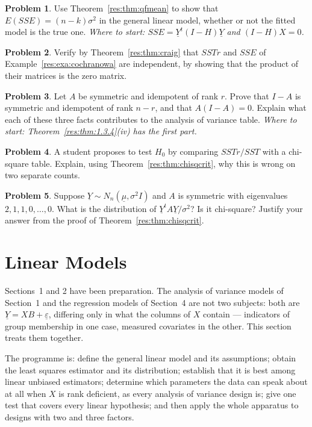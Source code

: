 \documentclass[11pt,a4paper]{article}
\theoremstyle{definition}
\newtheorem{problemx}{Problem}[section]
\newenvironment{problem}{\begin{problemx}}{\end{problemx}}
\begin{document}
\begin{problem}
Use Theorem~\ref{res:thm:qfmean} to show that
$E\left(SSE\right)=\left(n-k\right)\sigma^2$ in the general linear model,
whether or not the fitted model is the true one.
\emph{Where to start: $SSE=\underline{Y}^t(I-H)\underline{Y}$ and
$(I-H)X=0$.}
\end{problem}

\begin{problem}
Verify by Theorem~\ref{res:thm:craig} that $SSTr$ and $SSE$ of
Example~\ref{res:exa:cochranowa} are independent, by showing that the product
of their matrices is the zero matrix.
\end{problem}

\begin{problem}
Let $A$ be symmetric and idempotent of rank $r$. Prove that $I-A$ is symmetric
and idempotent of rank $n-r$, and that $A(I-A)=0$. Explain what each of these
three facts contributes to the analysis of variance table.
\emph{Where to start: Theorem~\ref{res:thm:1.3.4}(iv) has the first part.}
\end{problem}

\begin{problem}
A student proposes to test $H_0$ by comparing $SSTr/SST$ with a chi-square
table. Explain, using Theorem~\ref{res:thm:chisqcrit}, why this is wrong on
two separate counts.
\end{problem}

\begin{problem}
Suppose $\underline{Y}\sim N_n\left(\underline{\mu},\sigma^2I\right)$ and
$A$ is symmetric with eigenvalues $2,1,1,0,\dots,0$. What is the distribution
of $\underline{Y}^tA\underline{Y}/\sigma^2$? Is it chi-square? Justify your
answer from the proof of Theorem~\ref{res:thm:chisqcrit}.
\end{problem}

\newpage
\section{Linear Models}
Sections~1 and 2 have been preparation. The analysis of variance models of
Section~1 and the regression models of Section~4 are not two subjects: both are
$\underline{Y}=XB+\underline{\varepsilon}$, differing only in what the columns
of $X$ contain --- indicators of group membership in one case, measured
covariates in the other. This section treats them together.

The programme is: define the general linear model and its assumptions; obtain
the least squares estimator and its distribution; establish that it is best
among linear unbiased estimators; determine which parameters the data can speak
about at all when $X$ is rank deficient, as every analysis of variance design
is; give one test that covers every linear hypothesis; and then apply the whole
apparatus to designs with two and three factors.
\end{document}
